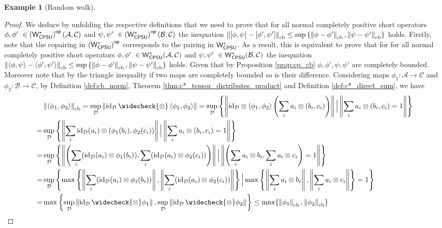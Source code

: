 \documentclass[10pt,a4paper]{amsart}
\theoremstyle{definition}
\theoremstyle{definition}
\newtheorem{example}[definition]{Example}
\theoremstyle{definition}
\theoremstyle{definition}
\theoremstyle{definition}
\theoremstyle{definition}
\begin{document}
\begin{example}[Random walk]
\begin{proof}
  We deduce by unfolding the respective definitions that we need to prove that for all normal completely positive short operators $\phi, \phi' \in \WstarCPSUop(\mathcal{A}, \mathcal{C})  $ and $\psi, \psi' \in \WstarCPSUop(\mathcal{B}, \mathcal{C})$ the inequation $\left\lVert [\phi, \psi] - [\phi', \psi'] \right\rVert_{\text{cb}} \leq  \sup \left\{ \left\lVert \phi-\phi' \right\rVert_{\text{cb}}, \left\lVert \psi-\psi' \right\rVert_{\text{cb}} \right\}$ holds.
  Firstly, note that the copairing in $\left(\mathsf{W^*_{CPSU}}\right)^{\mathsf{op}}$ corresponds to the pairing in $\mathsf{W^*_{CPSU}}$. As a result, this is equivalent to prove that for for all normal completely positive short operators $\phi, \phi' \in \WstarCPSU(\mathcal{A}, \mathcal{C})  $ and $\psi, \psi' \in \WstarCPSU(\mathcal{B}, \mathcal{C})$ the inequation $\left\lVert \langle \phi, \psi \rangle - \langle \phi', \psi'\rangle \right\rVert_{\text{cb}} \leq  \sup \left\{ \left\lVert \phi-\phi' \right\rVert_{\text{cb}}, \left\lVert \psi-\psi' \right\rVert_{\text{cb}} \right\}$ holds. Given that by Proposition \ref{prop:cp_cb} $\phi, \phi', \psi, \psi'$ are completely bounded. Moreover note that by the triangle inequality if two maps are completely bounded so is their difference. 
  Considering maps $\phi_1: \mathcal{A} \to \mathcal{C}$ and $\phi_2: \mathcal{B} \to \mathcal{C}$, by Definition \ref{def:cb_norm}, Theorem \ref{thm:c*_tensor_distributes_product} and Definition \ref{def:c*_direct_sum}, we have
\begin{align*}
  & \cbnorm{\langle \phi_1, \phi_2 \rangle} 
  =  \sup_{\mathcal{D}} \|\id_{\mathcal{D}}\, \widecheck{\otimes} \, \langle \phi_1, \phi_2 \rangle\| =  \sup_{\mathcal{D}} \left\{\norm{\id_{\mathcal{D}} \otimes  \langle \phi_1, \phi_2 \rangle  \left(\sum_i a_i \otimes (b_i,c_i)\right)} \Big| \norm{\sum_i a_i \otimes (b_i,c_i)=1} \right\} \\
  = &  \sup_{\mathcal{D}} \left\{\norm{  \sum_i \id_{\mathcal{D}}(a_i) \otimes (\phi_1 (b_i),\phi_2 (c_i))} \Big| \norm{\sum_i a_i \otimes (b_i,c_i)=1} \right\} \\
  = & \sup_{\mathcal{D}} \left\{\norm{  \left(\sum_i (\id_{\mathcal{D}}(a_i) \otimes \phi_1 (b_i)), \sum_i (\id_{\mathcal{D}}(a_i) \otimes \phi_2 (c_i))\right)} \Big| \norm{\left(\sum_i a_i \otimes b_i, \sum_i a_i \otimes c_i\right)=1} \right\} \\
  = & \sup_{\mathcal{D}} \left\{ \max \left\{\norm{  \sum_i (\id_{\mathcal{D}}(a_i) \otimes \phi_1 (b_i))}, \norm{\sum_i (\id_{\mathcal{D}}(a_i) \otimes \phi_2 (c_i))}\right\} \Big| \max \left\{ \norm{\sum_i a_i \otimes b_i}, \norm{\sum_i a_i \otimes c_i} \right\}=1 \right\} \\
  = & \max \left\{\sup_{\mathcal{D}} \norm{\id_{\mathcal{D}}\, \widecheck{\otimes}\phi_1} , \sup_{\mathcal{D}}  \norm{\id_{\mathcal{D}}\, \widecheck{\otimes}\phi_2} \right\}
  \leq \max \{ \cbnorm{\phi_1}, \cbnorm{\phi_2} \}
\end{align*}


\end{proof}
\end{example}
\end{document}
